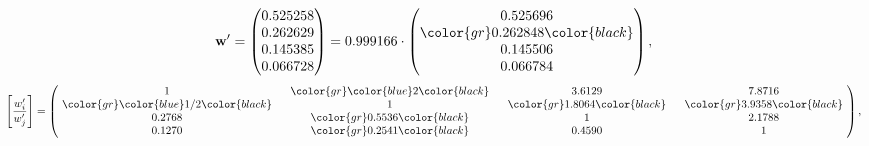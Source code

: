 \begin{example}
\begin{equation*}
\mathbf{w}^{\prime} =
\begin{pmatrix}
0.525258\\
0.262629\\
0.145385\\
0.066728
\end{pmatrix} =
0.999166\cdot
\begin{pmatrix}
0.525696\\
\color{gr} 0.262848\color{black} \\
0.145506\\
0.066784
\end{pmatrix},
\end{equation*}
\begin{equation*}
\left[ \frac{{w}^{\prime}_i}{{w}^{\prime}_j} \right] =
\begin{pmatrix}
$\,\,$ 1 $\,\,$ & $\,\,$\color{gr} \color{blue} 2\color{black} $\,\,$ & $\,\,$3.6129$\,\,$ & $\,\,$7.8716$\,\,$ \\
$\,\,$\color{gr} \color{blue}  1/2\color{black} $\,\,$ & $\,\,$ 1 $\,\,$ & $\,\,$\color{gr} 1.8064\color{black} $\,\,$ & $\,\,$\color{gr} 3.9358\color{black}   $\,\,$ \\
$\,\,$0.2768$\,\,$ & $\,\,$\color{gr} 0.5536\color{black} $\,\,$ & $\,\,$ 1 $\,\,$ & $\,\,$2.1788 $\,\,$ \\
$\,\,$0.1270$\,\,$ & $\,\,$\color{gr} 0.2541\color{black} $\,\,$ & $\,\,$0.4590$\,\,$ & $\,\,$ 1  $\,\,$ \\
\end{pmatrix},
\end{equation*}
\end{example}
\newpage
